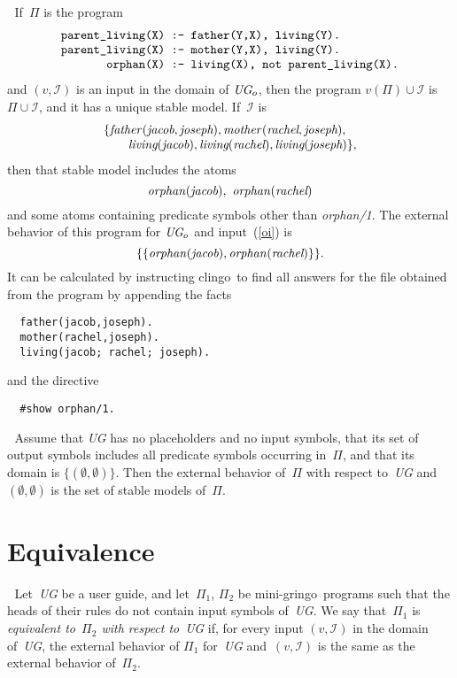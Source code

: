 \documentclass{article}
\def\beq{\begin{equation}}
\def\eeq#1{\label{#1}\end{equation}}
\def\ba{\begin{array}}
\def\ea{\end{array}}
\def\gringo{{\sc gringo}}
\def\clingo{{\sc clingo}}
\newcommand{\I}{\mathcal{I}}
\begin{document}
\medskip{}$\;$ If~$\Pi$ is the program
\beq\ba l
\verb|parent_living(X) :- father(Y,X), living(Y).|\\
\verb|parent_living(X) :- mother(Y,X), living(Y).|\\
\verb|       orphan(X) :- living(X), not parent_living(X).|
\ea\eeq{orphan1}
and $(v,\I)$ is an input in the domain of $\emph{UG}_o$, then the
program $v(\Pi)\cup\I$ is $\Pi\cup\I$, and it has a unique stable model.
If~$\I$ is
\beq\ba l
\{\emph{father\/}(\emph{jacob},\emph{joseph}),
\emph{mother\/}(\emph{rachel},\emph{joseph}),\\
\quad \quad \emph{living}(\emph{jacob}),
\emph{living}(\emph{rachel}),
\emph{living}(\emph{joseph})\},
\ea\eeq{oi}
then that stable model includes the atoms
$$\emph{orphan\/}(\emph{jacob}),\ \emph{orphan\/}(\emph{rachel})$$
and some atoms containing predicate symbols other than \emph{orphan/1}.
The external behavior of this program for $\emph{UG}_o$ and input~(\ref{oi})
is
\beq
\{\{\emph{orphan\/}(\emph{jacob}),\emph{orphan\/}(\emph{rachel})\}\}.
\eeq{ebor}
It can be calculated by instructing \clingo\ to
find all answers for the file obtained from the program by appending the
facts
\begin{verbatim}
  father(jacob,joseph).
  mother(rachel,joseph).
  living(jacob; rachel; joseph).
\end{verbatim}
and the directive
\begin{verbatim}
  #show orphan/1.
\end{verbatim}

\medskip{}$\;$
Assume that \emph{UG} has no placeholders and no input symbols,
that its set of output symbols includes all predicate symbols occurring
in~$\Pi$, and that its domain is $\{(\emptyset,\emptyset)\}$.  Then
the external
behavior of~$\Pi$ with respect to~\emph{UG} and $(\emptyset,\emptyset)$
is the set of stable models of~$\Pi$.

\section{Equivalence}

$\;$
Let~\emph{UG} be a user guide, and let~$\Pi_1$, $\Pi_2$ be mini-\gringo\
programs such that the heads of their rules do not contain input symbols
of~\emph{UG}.  We say that~$\Pi_1$ is \emph{equivalent to~$\Pi_2$ with
respect to}~\emph{UG} if, for every input $(v,\I)$ in the domain of~\emph{UG},
the external behavior of $\Pi_1$ for~\emph{UG} and~$(v,\I)$ is the
same as the external behavior of~$\Pi_2$.
\end{document}
